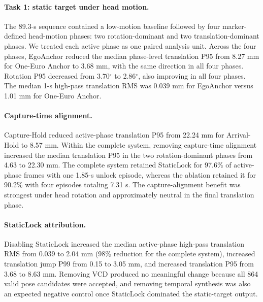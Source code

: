\paragraph{Task 1: static target under head motion.}
The 89.3-s sequence contained a low-motion baseline followed by four marker-defined head-motion phases: two rotation-dominant and two translation-dominant phases. We treated each active phase as one paired analysis unit. Across the four phases, EgoAnchor reduced the median phase-level translation P95 from 8.27 mm for One-Euro Anchor to 3.68 mm, with the same direction in all four phases. Rotation P95 decreased from 3.70$^\circ$ to 2.86$^\circ$, also improving in all four phases. The median 1-s high-pass translation RMS was 0.039 mm for EgoAnchor versus 1.01 mm for One-Euro Anchor.

\paragraph{Capture-time alignment.}
Capture-Hold reduced active-phase translation P95 from 22.24 mm for Arrival-Hold to 8.57 mm. Within the complete system, removing capture-time alignment increased the median translation P95 in the two rotation-dominant phases from 4.63 to 22.30 mm. The complete system retained StaticLock for 97.6\% of active-phase frames with one 1.85-s unlock episode, whereas the ablation retained it for 90.2\% with four episodes totaling 7.31 s. The capture-alignment benefit was strongest under head rotation and approximately neutral in the final translation phase.

\paragraph{StaticLock attribution.}
Disabling StaticLock increased the median active-phase high-pass translation RMS from 0.039 to 2.04 mm (98\% reduction for the complete system), increased translation jump P99 from 0.15 to 3.05 mm, and increased translation P95 from 3.68 to 8.63 mm. Removing VCD produced no meaningful change because all 864 valid pose candidates were accepted, and removing temporal synthesis was also an expected negative control once StaticLock dominated the static-target output.
